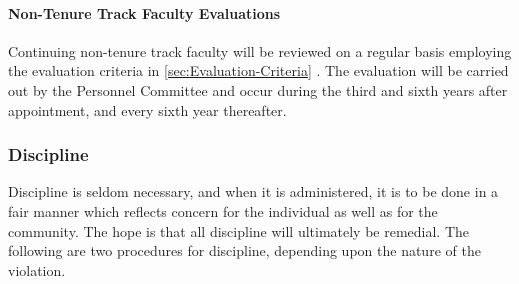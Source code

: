 			\paragraph{Non-Tenure Track Faculty Evaluations}
				Continuing non-tenure track faculty will be reviewed on a regular basis employing the evaluation criteria in
				\ref{sec:Evaluation-Criteria}
				.  The evaluation will be carried out by the Personnel Committee and occur during the third and sixth years after appointment, and every sixth year thereafter.
		\subsubsection{Discipline}
			\label{sec:Discipline}
			Discipline is seldom necessary, and when it is administered, it is to be done in a fair manner which reflects concern for the individual as well as for the community.  The hope is that all discipline will ultimately be remedial.  The following are two procedures for discipline, depending upon the nature of the violation.
